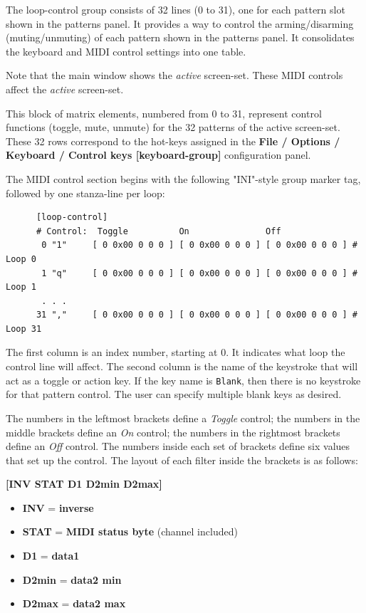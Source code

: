    The loop-control group consists of 32 lines (0 to 31), one for each
   pattern slot shown in the patterns panel.
   It provides a way to control the arming/disarming (muting/unmuting) of
   each pattern shown in the patterns panel.
   It consolidates the keyboard and MIDI control settings into one table.

   Note that the main window shows the \textsl{active} screen-set.
   These MIDI controls affect the \textsl{active} screen-set.

   This block of matrix elements, numbered from 0 to 31,
   represent control functions (toggle, mute, unmute) for the 32 patterns
   of the active screen-set.
   These 32 rows correspond to the hot-keys assigned in
   the \textbf{File / Options / Keyboard / Control keys [keyboard-group]} 
   configuration panel.

   The MIDI control section begins with the following "INI"-style
   group marker tag, followed by one stanza-line per loop:

   \begin{verbatim}
      [loop-control]
      # Control:  Toggle          On               Off
       0 "1"     [ 0 0x00 0 0 0 ] [ 0 0x00 0 0 0 ] [ 0 0x00 0 0 0 ] # Loop 0
       1 "q"     [ 0 0x00 0 0 0 ] [ 0 0x00 0 0 0 ] [ 0 0x00 0 0 0 ] # Loop 1
       . . .
      31 ","     [ 0 0x00 0 0 0 ] [ 0 0x00 0 0 0 ] [ 0 0x00 0 0 0 ] # Loop 31
   \end{verbatim}

   The first column is an index number, starting at 0.  It indicates what
   loop the control line will affect.
   The second column is the name of the keystroke that will act as a toggle or
   action key.
   If the key name is \texttt{Blank}, then there is no keystroke for that
   pattern control.  The user can specify multiple blank keys as desired.

   The numbers in the leftmost brackets define a \textsl{Toggle} control;
   the numbers in the middle brackets define an \textsl{On} control;
   the numbers in the rightmost brackets define an \textsl{Off} control.
   The numbers inside each set of brackets define six values that set up the
   control.  The layout of each filter inside the brackets is as follows:

      \textbf{[INV STAT D1 D2min D2max]}

   \begin{itemize}
      \item \textbf{INV} = \textbf{inverse}
      \item \textbf{STAT} = \textbf{MIDI status byte} (channel included) 
      \item \textbf{D1} = \textbf{data1}
      \item \textbf{D2min} = \textbf{data2 min}
      \item \textbf{D2max} = \textbf{data2 max}
   \end{itemize}

